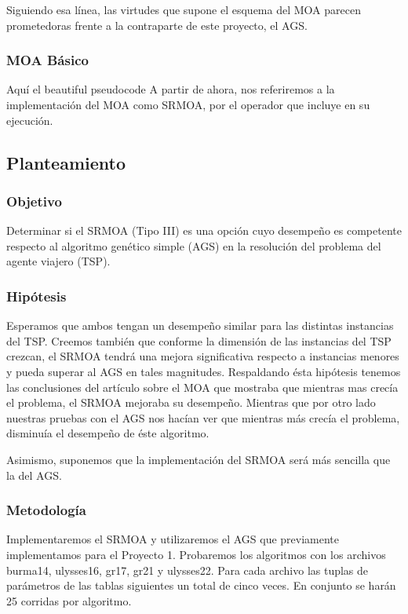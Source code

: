 \documentclass[12pt]{article}
\begin{document}
Siguiendo esa línea, las virtudes que supone el esquema del MOA parecen prometedoras frente a la contraparte de este proyecto, el AGS.


\subsubsection*{MOA Básico}
Aquí el beautiful pseudocode
A partir de ahora, nos referiremos a la implementación del MOA como SRMOA, por el operador que incluye en su ejecución.

\newpage
\subsection*{Planteamiento}
\subsubsection*{Objetivo}
Determinar si el SRMOA (Tipo III) es una opción cuyo desempeño es competente respecto al algoritmo genético simple (AGS) en la resolución del problema del agente viajero (TSP).
\subsubsection*{Hipótesis}
 Esperamos que ambos tengan un desempeño similar para las distintas instancias del TSP. Creemos también que conforme la dimensión de las instancias del TSP crezcan, el SRMOA tendrá una mejora significativa respecto a instancias menores y pueda superar al AGS en tales magnitudes.  Respaldando ésta hipótesis tenemos las conclusiones del artículo sobre el MOA que mostraba que mientras mas crecía el problema, el SRMOA mejoraba su desempeño. Mientras que por otro lado nuestras pruebas con el AGS nos hacían ver que mientras más crecía el problema, disminuía el desempeño de éste algoritmo.

Asimismo, suponemos que la implementación del SRMOA será más sencilla que la del AGS.
\subsubsection*{Metodología}
Implementaremos el SRMOA y utilizaremos el AGS que previamente implementamos para el Proyecto 1. Probaremos los algoritmos con los archivos burma14, ulysses16, gr17, gr21 y ulysses22. Para cada archivo las tuplas de parámetros de las tablas siguientes un total de cinco veces. En conjunto se harán 25 corridas por algoritmo.\\
\end{document}
